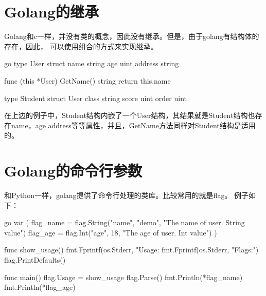 \section{Golang的继承}
Golang和c一样，并没有类的概念，因此没有继承。但是，由于golang有结构体的存在，因此，
可以使用组合的方式来实现继承。
\begin{code-block}{go}
type User struct{
    name string
    age uint
    address string
}

func (this *User) GetName() string{
    return this.name
}

type Student struct{
    User
    class string
    score uint
    order uint
}
\end{code-block}

在上边的例子中，Student结构内嵌了一个User结构，其结果就是Student结构也存在name，age
address等等属性，并且，GetName方法同样对Student结构是适用的。

\section{Golang的命令行参数}
和Python一样，golang提供了命令行处理的类库。比较常用的就是flag。
例子如下：
\begin{code-block}{go}
var (
    flag_name = flag.String("name", "demo", "The name of user. String value")
    flag_age  = flag.Int("age", 18, "The age of user. Int value")
)

func show_usage() {
    fmt.Fprintf(os.Stderr, "Usage: %
    fmt.Fprintf(os.Stderr, "Flags:\n")
    flag.PrintDefaults()
}

func main(){
    flag.Usage = show_usage
    flag.Parse()
    fmt.Println(*flag_name)
    fmt.Println(*flag_age)
}
\end{code-block}

